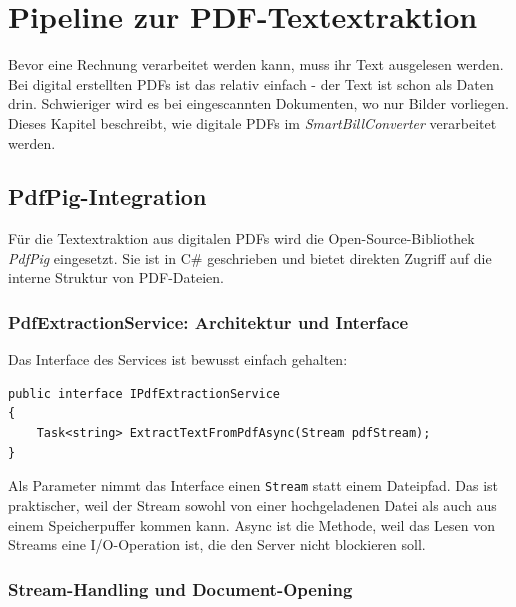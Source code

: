 \chapter{Pipeline zur PDF-Textextraktion}
\label{chap:pdf_extraktion}

Bevor eine Rechnung verarbeitet werden kann, muss ihr Text ausgelesen werden. Bei digital erstellten PDFs ist das relativ einfach - der Text ist schon als Daten drin. Schwieriger wird es bei eingescannten Dokumenten, wo nur Bilder vorliegen. Dieses Kapitel beschreibt, wie digitale PDFs im \textit{SmartBillConverter} verarbeitet werden.

\section{PdfPig-Integration}
\label{sec:pdfpig_integration}

Für die Textextraktion aus digitalen PDFs wird die Open-Source-Bibliothek \textit{PdfPig} eingesetzt. Sie ist in C\# geschrieben und bietet direkten Zugriff auf die interne Struktur von PDF-Dateien.

\subsection{PdfExtractionService: Architektur und Interface}

Das Interface des Services ist bewusst einfach gehalten:

\begin{lstlisting}[language={[Sharp]C}, caption={IPdfExtractionService Interface}, label={lst:pdf_interface}]
public interface IPdfExtractionService
{
    Task<string> ExtractTextFromPdfAsync(Stream pdfStream);
}
\end{lstlisting}

Als Parameter nimmt das Interface einen \texttt{Stream} statt einem Dateipfad. Das ist praktischer, weil der Stream sowohl von einer hochgeladenen Datei als auch aus einem Speicherpuffer kommen kann. Async ist die Methode, weil das Lesen von Streams eine I/O-Operation ist, die den Server nicht blockieren soll.

\subsection{Stream-Handling und Document-Opening}

